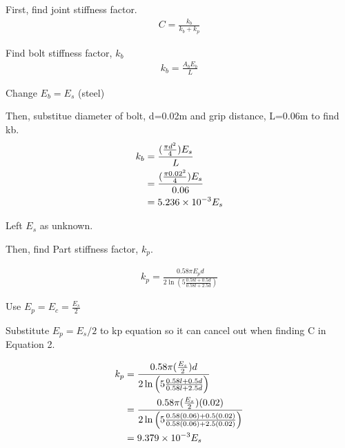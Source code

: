\documentclass[a4paper, fleqn]{article}
\providecommand{\sci}[1]{\protect\ensuremath{\times 10^{\StrSubstitute[0]{#1}{e}{}}}}
\begin{document}
First, find joint stiffness factor.
\begin{equation}
    \begin{aligned}
    C=\frac{k_b}{k_b+k_p}
    \end{aligned}
\end{equation}

Find bolt stiffness factor, $k_b$
\begin{equation}
    \begin{aligned}
    k_b=\frac{A_bE_b}{L}
    \end{aligned}
\end{equation}

Change $E_b=E_s$ (steel)

Then, substitue diameter of bolt, d=0.02m and grip distance, L=0.06m to find kb.
\begin{equation*}
    \begin{aligned}
    k_b&=\frac{(\frac{\pi d^2}{4})E_s}{L} \\
    &=\frac{(\frac{\pi 0.02^2}{4})E_s}{0.06} \\
    &= 5.236\sci{e-3}E_s
    \end{aligned}
\end{equation*}

Left $E_s$ as unknown.
\vspace{10pt}

Then, find Part stiffness factor, $k_p$.

\begin{equation}
    \begin{aligned}
    k_p=\frac{0.58\pi E_p d}{2\ln\left( 5\frac{0.58l+0.5d}{0.58l+2.5d} \right)}
    \end{aligned}
\end{equation}

Use $E_p=E_c=\frac{E_s}{2}$

Substitute $E_p=E_s/2$ to kp equation so it can cancel out when finding C in Equation 2.

\begin{equation*}
    \begin{aligned}
        k_p&=\frac{0.58\pi (\frac{E_s}{2}) d}{2\ln\left( 5\frac{0.58l+0.5d}{0.58l+2.5d} \right)}\\
        &=\frac{0.58\pi (\frac{E_s}{2}) (0.02)}{2\ln\left( 5\frac{0.58(0.06)+0.5(0.02)}{0.58(0.06)+2.5(0.02)} \right)}\\
        &= 9.379\sci{e-3}E_s
    \end{aligned}
\end{equation*}
\end{document}

